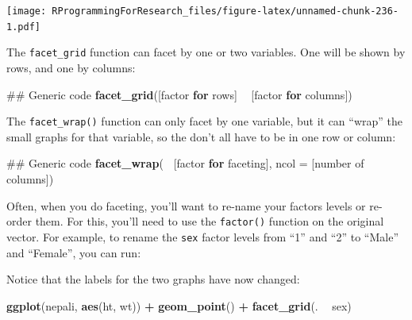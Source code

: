 \documentclass[]{book}
\makeatletter
\newenvironment{Shaded}{\begin{snugshade}}{\end{snugshade}}
\newcommand{\KeywordTok}[1]{\textcolor[rgb]{0.13,0.29,0.53}{\textbf{#1}}}
\newcommand{\DataTypeTok}[1]{\textcolor[rgb]{0.13,0.29,0.53}{#1}}
\newcommand{\DecValTok}[1]{\textcolor[rgb]{0.00,0.00,0.81}{#1}}
\newcommand{\StringTok}[1]{\textcolor[rgb]{0.31,0.60,0.02}{#1}}
\newcommand{\ControlFlowTok}[1]{\textcolor[rgb]{0.13,0.29,0.53}{\textbf{#1}}}
\newcommand{\OperatorTok}[1]{\textcolor[rgb]{0.81,0.36,0.00}{\textbf{#1}}}
\newcommand{\NormalTok}[1]{#1}
\newenvironment{kframe}{%
\medskip{}
\setlength{\fboxsep}{.8em}
 \def\at@end@of@kframe{}%
 \ifinner\ifhmode%
  \def\at@end@of@kframe{\end{minipage}}%
  \begin{minipage}{\columnwidth}%
 \fi\fi%
 \def\FrameCommand##1{\hskip\@totalleftmargin \hskip-\fboxsep
 \colorbox{shadecolor}{##1}\hskip-\fboxsep
     \hskip-\linewidth \hskip-\@totalleftmargin \hskip\columnwidth}%
 \MakeFramed {\advance\hsize-\width
   \@totalleftmargin\z@ \linewidth\hsize
   \@setminipage}}%
 {\par\unskip\endMakeFramed%
 \at@end@of@kframe}
\renewenvironment{Shaded}{\begin{kframe}}{\end{kframe}}
\theoremstyle{definition}
\theoremstyle{definition}
\theoremstyle{definition}
\theoremstyle{remark}
\makeatother
\begin{document}
\texttt{[image: RProgrammingForResearch\_files/figure-latex/unnamed-chunk-236-1.pdf]}

The \texttt{facet\_grid} function can facet by one or two variables. One
will be shown by rows, and one by columns:

\begin{Shaded}
\begin{Highlighting}[]
\NormalTok{## Generic code}
\KeywordTok{facet_grid}\NormalTok{([factor }\ControlFlowTok{for}\NormalTok{ rows] }\OperatorTok{~}\StringTok{ }\NormalTok{[factor }\ControlFlowTok{for}\NormalTok{ columns])}
\end{Highlighting}
\end{Shaded}

The \texttt{facet\_wrap()} function can only facet by one variable, but
it can ``wrap'' the small graphs for that variable, so the don't all
have to be in one row or column:

\begin{Shaded}
\begin{Highlighting}[]
\NormalTok{## Generic code}
\KeywordTok{facet_wrap}\NormalTok{(}\OperatorTok{~}\StringTok{ }\NormalTok{[factor }\ControlFlowTok{for}\NormalTok{ faceting], }\DataTypeTok{ncol =}\NormalTok{ [number of columns])}
\end{Highlighting}
\end{Shaded}

Often, when you do faceting, you'll want to re-name your factors levels
or re-order them. For this, you'll need to use the \texttt{factor()}
function on the original vector. For example, to rename the \texttt{sex}
factor levels from ``1'' and ``2'' to ``Male'' and ``Female'', you can
run:

\begin{Shaded}
\end{Shaded}

Notice that the labels for the two graphs have now changed:

\begin{Shaded}
\begin{Highlighting}[]
\KeywordTok{ggplot}\NormalTok{(nepali, }\KeywordTok{aes}\NormalTok{(ht, wt)) }\OperatorTok{+}\StringTok{ }
\StringTok{        }\KeywordTok{geom_point}\NormalTok{() }\OperatorTok{+}\StringTok{ }
\StringTok{        }\KeywordTok{facet_grid}\NormalTok{(. }\OperatorTok{~}\StringTok{ }\NormalTok{sex)}
\end{Highlighting}
\end{Shaded}
\end{document}

